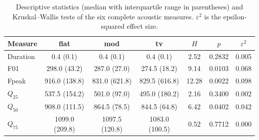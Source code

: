 \begin{table}[!ht]
\centering
\caption{Descriptive statistics (median with interquartile range in parentheses) and
Kruskal--Wallis tests of the six complete acoustic measures. $\varepsilon^2$ is the
epsilon-squared effect size.}
\label{tab:desc}
\footnotesize
\begin{tabular}{lcccccc}
\toprule
Measure & flat & mod & tv & $H$ & $p$ & $\varepsilon^2$\\
\midrule
Duration & 0.4 (0.1) & 0.4 (0.1) & 0.4 (0.1) & 2.52 & 0.2832 & 0.005\\
F01 & 298.0 (43.2) & 287.0 (27.0) & 274.5 (18.2) & 9.14 & 0.0103 & 0.068\\
Fpeak & 916.0 (138.8) & 831.0 (621.8) & 829.5 (616.8) & 12.28 & 0.0022 & 0.098\\
$Q_{25}$ & 537.5 (154.2) & 501.0 (97.0) & 495.0 (180.2) & 2.16 & 0.3400 & 0.002\\
$Q_{50}$ & 908.0 (111.5) & 864.5 (78.5) & 844.5 (64.8) & 6.42 & 0.0402 & 0.042\\
$Q_{75}$ & 1099.0 (209.8) & 1097.5 (120.8) & 1083.0 (100.5) & 0.52 & 0.7712 & 0.000\\
\bottomrule
\end{tabular}
\end{table}
